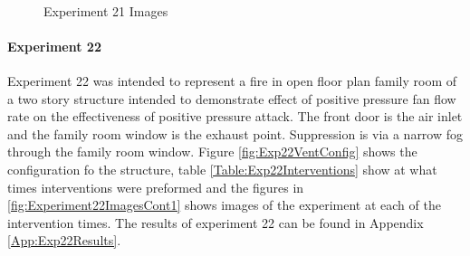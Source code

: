 \documentclass{article}
\begin{document}
\begin{figure}[H]
	\ContinuedFloat 
	\centering 
	 \ 
	\caption{Experiment 21 Images}
	\label{fig:Experiment21ImagesCont3} 
\end{figure}

\paragraph{Experiment 22}\mbox{}

Experiment 22 was intended to represent a fire in open floor plan family room of a two story structure intended to demonstrate effect of positive pressure fan flow rate on the effectiveness of positive pressure attack. The front door is the air inlet and the family room window is the exhaust point. Suppression is via a narrow fog through the family room window. Figure \ref{fig:Exp22VentConfig} shows the configuration fo the structure, table \ref{Table:Exp22Interventions} show at what times interventions were preformed and the figures in \ref{fig:Experiment22ImagesCont1} shows images of the experiment at each of the intervention times. The results of experiment 22 can be found in Appendix \ref{App:Exp22Results}.
\end{document}
